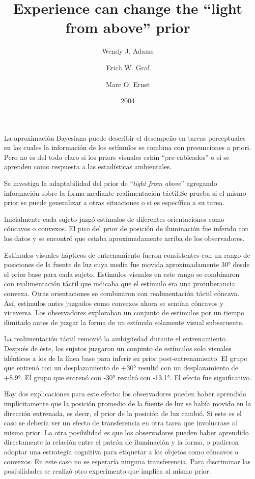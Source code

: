 \documentclass[a4paper,12pt]{article}
\title{Experience can change the ``light from above'' prior}
\author{Wendy J. Adams \and Erich W. Graf \and Marc O. Ernst}
\date{2004}
\begin{document}
{\scshape\bfseries \maketitle}

La aproximación Bayesiana puede describir el desempeño en tareas perceptuales en las cuales la información de los estímulos se combina con presunciones a priori. Pero no es del todo claro si los priors visuales están ``pre-cableados'' o si se aprenden como respuesta a las estadísticas ambientales.

Se investiga la adaptabilidad del prior de ``{\itshape light from above}'' agregando información sobre la forma mediante realimentación táctil.Se prueba si el mismo prior se puede generalizar a otras situaciones o si es específico a su tarea.

Inicialmente cada sujeto juzgó estímulos de diferentes orientaciones como cóncavos o convexos. El pico del prior de posición de iluminación fue inferido con los datos y se encontró que estaba aproximadamente arriba de los observadores.

Estímulos visuales-hápticos de entrenamiento fueron consistentes con un rango de posiciones de la fuente de luz cuya media fue movida aproximadamente 30° desde el prior base para cada sujeto. Estímulos visuales en este rango se combinaron con realimentación táctil que indicaba que el estímulo era una protuberancia convexa. Otras orientaciones se combinaron con realimentación táctil cóncava. Así, estímulos antes juzgados como convexos ahora se sentían cóncavos y viceversa. Los observadores exploraban un conjunto de estímulos por un tiempo ilimitado antes de juzgar la forma de un estímulo solamente visual subsecuente.

La realimentación táctil removió la ambigüedad durante el entrenamiento. Después de éste, los sujetos juzgaron un conjunto de estímulos solo visuales idénticos a los de la línea base para inferir su prior post-entrenamiento. El grupo que entrenó con un desplazamiento de +30° resultó con un desplazamiento de +8.9°. El grupo que entrenó con -30° resultó con -13.1°. El efecto fue significativo.

Hay dos explicaciones para este efecto: los observadores pueden haber aprendido implícitamente que la posición promedio de la fuente de luz se había movido en la dirección entrenada, es decir, el prior de la posición de luz cambió. Si este es el caso se debería ver un efecto de transferencia en otra tarea que involucrase al mismo prior. La otra posibilidad es que los observadores pueden haber aprendido directamente la relación entre el patrón de iluminación y la forma, o pudieron adoptar una estrategia cognitiva para etiquetar a los objetos como cóncavos o convexos. En este caso no se esperaría ninguna transferencia. Para discriminar las posibilidades se realizó otro experimento que implica al mismo prior.
\end{document}
